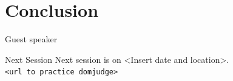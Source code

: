 \documentclass[11pt,pdf, aspectratio=169]{beamer}
\begin{document}
  \section{Conclusion}
  \begin{frame}{Guest speaker}
  \end{frame}
  \begin{frame}{Next Session}
    Next session is on <Insert date and location>.\\

    \texttt{<url to practice domjudge>}
  \end{frame}
\end{document}
